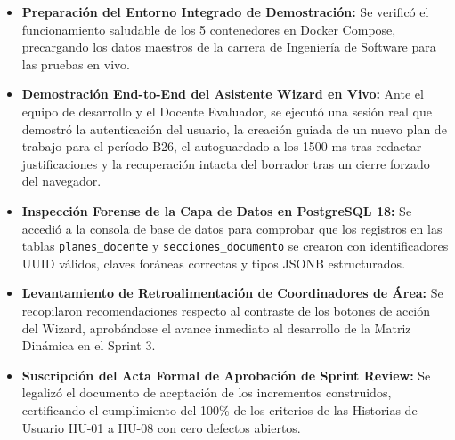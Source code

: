 \documentclass[12pt,a4paper]{article}
\begin{document}
\begin{itemize}[leftmargin=1.5em, itemsep=4pt]
    \item \textbf{Preparación del Entorno Integrado de Demostración:} Se verificó el funcionamiento saludable de los 5 contenedores en Docker Compose, precargando los datos maestros de la carrera de Ingeniería de Software para las pruebas en vivo.
    \item \textbf{Demostración End-to-End del Asistente Wizard en Vivo:} Ante el equipo de desarrollo y el Docente Evaluador, se ejecutó una sesión real que demostró la autenticación del usuario, la creación guiada de un nuevo plan de trabajo para el período B26, el autoguardado a los 1500 ms tras redactar justificaciones y la recuperación intacta del borrador tras un cierre forzado del navegador.
    \item \textbf{Inspección Forense de la Capa de Datos en PostgreSQL 18:} Se accedió a la consola de base de datos para comprobar que los registros en las tablas \texttt{planes\_\allowbreak  docente} y \texttt{secciones\_\allowbreak  documento} se crearon con identificadores UUID válidos, claves foráneas correctas y tipos JSONB estructurados.
    \item \textbf{Levantamiento de Retroalimentación de Coordinadores de Área:} Se recopilaron recomendaciones respecto al contraste de los botones de acción del Wizard, aprobándose el avance inmediato al desarrollo de la Matriz Dinámica en el Sprint 3.
    \item \textbf{Suscripción del Acta Formal de Aprobación de Sprint Review:} Se legalizó el documento de aceptación de los incrementos construidos, certificando el cumplimiento del 100\% de los criterios de las Historias de Usuario HU-01 a HU-08 con cero defectos abiertos.
\end{itemize}
\end{document}
